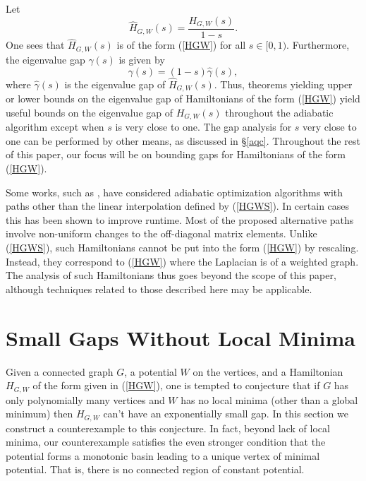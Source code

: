 Let
\begin{equation}
\hat{H}_{G,W}(s) = \frac{H_{G,W}(s)}{1-s}.
\end{equation}
One sees that $\hat{H}_{G,W}(s)$ is of the form (\ref{HGW}) for all $s
\in [0,1)$. Furthermore, the eigenvalue gap $\gamma(s)$ is given by
\begin{equation}
\gamma(s) = (1-s) \hat{\gamma}(s),
\end{equation}
where $\hat{\gamma}(s)$ is the eigenvalue gap of
$\hat{H}_{G,W}(s)$. Thus, theorems yielding upper or lower bounds on
the eigenvalue gap of Hamiltonians of the form (\ref{HGW}) yield useful
bounds on the eigenvalue gap of $H_{G,W}(s)$ throughout the adiabatic
algorithm except when $s$ is very close to one. The gap
analysis for $s$ very close to one can be performed by other means, as
discussed in \S \ref{aqc}. Throughout the rest of this paper, our
focus will be on bounding gaps for Hamiltonians of the form (\ref{HGW}).

Some works, such as \cite{diffinit, diffmid1, diffmid2}, have
considered adiabatic optimization algorithms with paths other than the
linear interpolation defined by (\ref{HGWS}). In certain cases this
has been shown to improve runtime. Most of the proposed alternative
paths involve non-uniform changes to the off-diagonal matrix
elements. Unlike (\ref{HGWS}), such Hamiltonians cannot be put into
the form (\ref{HGW}) by rescaling. Instead, they correspond to
(\ref{HGW}) where the Laplacian is of a weighted graph. The analysis
of such Hamiltonians thus goes beyond the scope of this paper,
although techniques related to those described here may be
applicable.

\section{Small Gaps Without Local Minima}
\label{counter}

Given a connected graph $G$, a potential $W$ on the vertices, and a
Hamiltonian $H_{G,W}$ of the form given in (\ref{HGW}), one is tempted to
conjecture that if $G$ has only polynomially many vertices and $W$ has
no local minima (other than a global minimum) then $H_{G,W}$ can't
have an exponentially small gap. In this section we construct a
counterexample to this conjecture. In fact, beyond lack of local
minima, our counterexample satisfies the even stronger condition that
the potential forms a monotonic basin leading to a unique vertex of
minimal potential. That is, there is no connected region of constant
potential.

